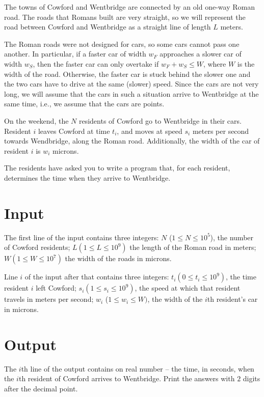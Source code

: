 
The towns of Cowford and Wentbridge are connected by an old one-way Roman road.
The roads that Romans built are very straight, so we will represent the road between Cowford and Wentbridge as a straight line of length $L$ meters.

The Roman roads were not designed for cars, so some cars cannot pass one another.
In particular, if a faster car of width $w_F$ approaches a slower car of width $w_S$, then the faster car can only overtake if $w_F + w_S \leq W$,
where $W$ is the width of the road.
Otherwise, the faster car is stuck behind the slower one and the two cars have to drive at the same (slower) speed.
Since the cars are not very long, we will assume that the cars in such a situation arrive to Wentbridge at the same time, i.e., we assume that the cars are points.

On the weekend, the $N$ residents of Cowford go to Wentbridge in their cars.
Resident $i$ leaves Cowford at time $t_i$, and moves at speed $s_i$ meters per second towards Wendbridge, along the Roman road.
Additionally, the width of the car of resident $i$ is $w_i$ microns.

The residents have asked you to write a program that, for each resident, determines the time when they arrive to Wentbridge.

\section*{Input}
The first line of the input contains three integers: $N$ ($1 \leq N \leq 10^5$), the number of Cowford residents; $L (1 \leq L \leq 10^9)$ the length of the Roman road in meters; $W (1 \leq W \leq 10^7)$ the width of the roads in microns.

Line $i$ of the input after that contains three integers:
$t_i (0 \leq t_i \leq 10^9)$, the time resident $i$ left Cowford;
$s_i (1 \leq s_i \leq 10^9)$, the speed at which that resident travels in meters per second;
$w_i$ ($1 \leq w_i \leq W)$, the width of the $i$th resident's car in microns.

\section*{Output}
The $i$th line of the output contains on real number
-- the time, in seconds, when the $i$th resident of Cowford arrives to Wentbridge.
Print the answers with $2$ digits after the decimal point.

